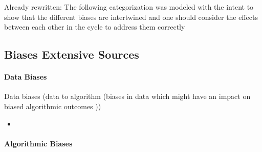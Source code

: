 \documentclass[12pt, a4paper, oneside]{book}   	%
\newif\ifrawcitationactive
\newcommand{\rawcitationstart}{\color{purple}\rawcitationactivetrue}
\begin{document}
			Already rewritten: The following categorization was modeled with the intent to show that the different biases are intertwined and one should consider the effects between each other in the cycle to address them correctly \autocite{Mehrabi_2021}
		




			\rawcitationstart
			\subsection{Biases Extensive Sources}
			
			\paragraph{Data Biases}
			Data biases (data to algorithm (biases in data which might have an impact on biased algorithmic outcomes \autocite{Mehrabi_2021}))	
			\begin{itemize}
				\item 
			\end{itemize}	
			
			
			\paragraph{Algorithmic Biases}
			
\end{document}
